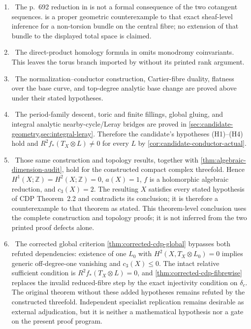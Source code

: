 \begin{enumerate}[label=\arabic*.]
\item \Refuted\ The p.~692 reduction in \cite{CDP2020} is not a formal
consequence of the two cotangent sequences.
 is a proper geometric counterexample to
that exact sheaf-level inference for a non-torsion bundle on the central
fibre; no extension of that bundle to the displayed total space is claimed.
\item \Refuted\ The direct-product homology formula in
\cite[Lemma~3.2]{CDP1998} omits monodromy coinvariants.  This leaves the
torus branch imported by \cite{CDP2020} without its printed rank argument.
\item \Verified\ The normalization--conductor construction,
Cartier-fibre duality, flatness over the base curve, and top-degree analytic
base change are proved above under their stated hypotheses.
\item \Verified\ The period-family descent, toric and finite fillings,
global gluing, and integral analytic nearby-cycle/Leray bridges are proved in
\cref{sec:candidate-geometry,sec:integral-leray}.  Therefore the candidate's
hypotheses (H1)--(H4) hold and
$R^2f_*(T_X\otimes L)\ne0$ for every $L$ by
\cref{cor:candidate-conductor-actual}.
\item \Verified\ Those same construction and topology results, together
with \cref{thm:algebraic-dimension-audit}, hold for the constructed compact
complex threefold.  Hence
$H^1(X;\mathbb Z)=H^2(X;\mathbb Z)=0$, $a(X)=1$, $f$ is a holomorphic
algebraic reduction, and $c_3(X)=2$.  The resulting $X$ satisfies every
stated hypothesis of CDP Theorem~2.2 and contradicts its conclusion; it is
therefore a counterexample to that theorem as stated.  This theorem-level
conclusion uses the complete construction and topology proofs; it is not
inferred from the two printed proof defects alone.
\item \Verified\ The corrected global criterion
\cref{thm:corrected-cdp-global} bypasses both refuted dependencies:
existence of one \(L_0\) with
\(H^2(X,T_X\otimes L_0)=0\) implies generic off-degree-one vanishing and
\(c_3(X)\le0\).  The intact relative sufficient condition is
\(R^2f_*(T_X\otimes L)=0\), and
\cref{thm:corrected-cdp-fibrewise} replaces the invalid reduced-fibre step
by the exact injectivity condition on \(\delta_c\).  The original theorem
without these added hypotheses remains refuted by the constructed
threefold.  Independent specialist replication remains desirable as
external adjudication, but it is neither a mathematical hypothesis nor a
gate on the present proof program.
\end{enumerate}

